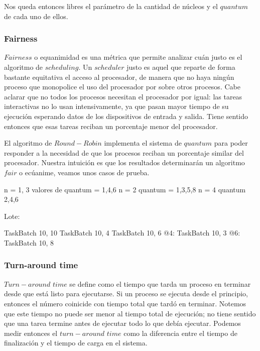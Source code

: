 Nos queda entonces libres el parámetro de la cantidad de núcleos y el $quantum$ de cada uno de ellos.


\subsubsection{Fairness}

$Fairness$ o equanimidad es una métrica que permite analizar cuán justo es el algoritmo de $scheduling$. Un $scheduler$ justo es aquel que reparte de forma bastante equitativa el acceso al procesador, de manera que no haya ningún proceso que monopolice el uso del procesador por sobre otros procesos. Cabe aclarar que no todos los procesos necesitan el procesador por igual: las tareas interactivas no lo usan intensivamente, ya que pasan mayor tiempo de su ejecución esperando datos de los dispositivos de entrada y salida. Tiene sentido entonces que esas tareas reciban un porcentaje menor del procesador.

El algoritmo de $Round-Robin$ implementa el sistema de $quantum$ para poder responder a la necesidad de que los procesos reciban un porcentaje similar del procesador. Nuestra intuición es que los resultados determinarán un algoritmo $fair$ o ecúanime, veamos unos casos de prueba.

n = 1, 3 valores de quantum = 1,4,6
n = 2 quantum = 1,3,5,8
n = 4 quantum 2,4,6

Lote:

TaskBatch 10, 10
TaskBatch 10, 4
TaskBatch 10, 6
@4:
TaskBatch 10, 3
@6:
TaskBatch 10, 8

% 
% 

\subsubsection{Turn-around time}

$Turn-around$ $time$ se define como el tiempo que tarda un proceso en terminar desde que est\'a listo para ejecutarse. Si un proceso se ejecuta desde el principio, entonces el n\'umero coinicide con tiempo total que tard\'o en terminar. Notemos que este tiempo no puede ser menor al tiempo total de ejecuci\'on; no tiene sentido que una tarea termine antes de ejecutar todo lo que deb\'ia ejecutar. Podemos medir entonces el $turn-around$ $time$ como la diferencia entre el tiempo de finalización y el tiempo de carga en el sistema. 

